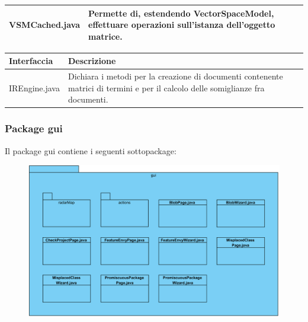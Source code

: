 \documentclass[11pt]{article}
\begin{document}
\begin{description}
\begin{tabular}{|p{}|p{}|}
		\hline
		VSMCached.java & Permette di, estendendo VectorSpaceModel, effettuare operazioni sull'istanza dell'oggetto matrice.  \\
		\hline
	\end{tabular}
	\item \begin{tabular}{|p{}|p{}|}
		\hline
		\textbf{Interfaccia} & \textbf{Descrizione}\\
		\hline
		IREngine.java & Dichiara i metodi per la creazione di documenti contenente matrici di termini e per il calcolo delle somiglianze fra documenti. \\
		\hline
	\end{tabular}	
			\end{description}
		\subsubsection{Package gui}
			Il package gui contiene i seguenti sottopackage:
			 \begin{figure}[!h]
				\centering
				\includegraphics[width=15cm]{diagrams/GUIPackageDiagram}
			\end{figure}
\end{document}
